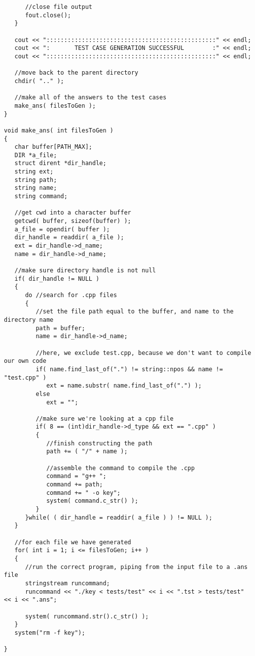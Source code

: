 \begin{lstlisting}
      //close file output
      fout.close();
   }
   
   cout << "::::::::::::::::::::::::::::::::::::::::::::::::" << endl;
   cout << ":       TEST CASE GENERATION SUCCESSFUL        :" << endl;
   cout << "::::::::::::::::::::::::::::::::::::::::::::::::" << endl;
   
   //move back to the parent directory
   chdir( ".." );
   
   //make all of the answers to the test cases
   make_ans( filesToGen );
}

void make_ans( int filesToGen )
{
   char buffer[PATH_MAX];
   DIR *a_file;
   struct dirent *dir_handle;
   string ext;
   string path;
   string name;
   string command;
   
   //get cwd into a character buffer
   getcwd( buffer, sizeof(buffer) );
   a_file = opendir( buffer );
   dir_handle = readdir( a_file );
   ext = dir_handle->d_name;
   name = dir_handle->d_name;
   
   //make sure directory handle is not null
   if( dir_handle != NULL )
   {
      do //search for .cpp files
      {
         //set the file path equal to the buffer, and name to the directory name
         path = buffer;
         name = dir_handle->d_name;
         
         //here, we exclude test.cpp, because we don't want to compile our own code
         if( name.find_last_of(".") != string::npos && name != "test.cpp" )
            ext = name.substr( name.find_last_of(".") );
         else
            ext = "";
         
         //make sure we're looking at a cpp file
         if( 8 == (int)dir_handle->d_type && ext == ".cpp" )
         {
            //finish constructing the path
            path += ( "/" + name );

            //assemble the command to compile the .cpp
            command = "g++ ";
            command += path;
            command += " -o key";
            system( command.c_str() );
         }
      }while( ( dir_handle = readdir( a_file ) ) != NULL );
   }
   
   //for each file we have generated
   for( int i = 1; i <= filesToGen; i++ )
   {
      //run the correct program, piping from the input file to a .ans file
      stringstream runcommand;
      runcommand << "./key < tests/test" << i << ".tst > tests/test" << i << ".ans";
      
      system( runcommand.str().c_str() );
   }
   system("rm -f key");
   
}
\end{lstlisting}

